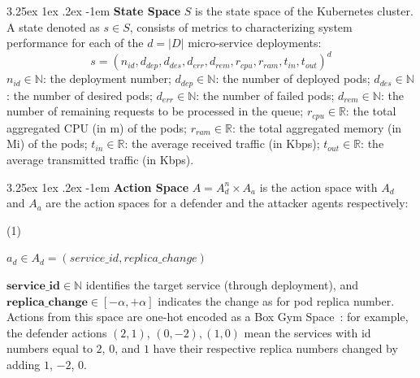 \documentclass[conference]{IEEEtran}
\makeatletter
\renewcommand\paragraph{\@startsection{paragraph}{5}{\z@}%
  {3.25ex \@plus1ex \@minus.2ex}%
  {-1em}%
  {\normalfont\normalsize\bfseries}}
\makeatother
\begin{document}
\noindent \paragraph{\textbf{State Space}} $S$ is the state space of the Kubernetes cluster. A state denoted as $s \in S$, consists of metrics to characterizing system performance for each of the $d = |D|$ micro-service deployments:
$$
s = (n_{id}, d_{dep}, d_{des}, d_{err}, d_{rem}, r_{cpu}, r_{ram}, t_{in}, t_{out})^d
$$
$n_{id} \in \mathbb{N}$: the deployment number; \quad
$d_{dep} \in \mathbb{N}$: the number of deployed pods; \quad 
$d_{des} \in \mathbb{N}$: the number of desired pods; \quad
$d_{err} \in \mathbb{N}$: the number of failed pods; \quad
$d_{rem} \in \mathbb{N}$: the number of remaining requests to be processed in the queue; \quad
$r_{cpu} \in \mathbb{R}$: the total aggregated CPU (in m) of the pods; \quad
$r_{ram} \in \mathbb{R}$: the total aggregated memory (in Mi) of the pods; \quad
$t_{in} \in \mathbb{R}$: the average received traffic (in Kbps); \quad
$t_{out} \in \mathbb{R}$: the average transmitted traffic (in Kbps).


\noindent \paragraph{\textbf{Action Space}} $A = A_d^n \times A_a$ is the action space with $A_d$ and $A_a$ are the action spaces for a defender and the attacker agents respectively:

\vspace{0.3cm}

\indent\begin{minipage}{0.15\linewidth}
    (1)
\end{minipage}
\begin{minipage}{0.9\linewidth}
    \raggedright
    $\displaystyle a_d \in A_d = (service\_id, replica\_change)$
\end{minipage}

\vspace{0.3cm}

\indent $\mathbf{service\_id} \in \mathbb{N}$ identifies the target service (through deployment), and $\mathbf{replica\_change} \in [-\alpha, +\alpha]$ indicates the change as for pod replica number. Actions from this space are one-hot encoded as a Box Gym Space~\cite{openAIGymActionSpaces}: for example, the defender actions $(2,1)$, $(0,-2), (1,0)$ mean the services with id numbers equal to $2$, $0$, and $1$ have their respective replica numbers changed by adding $1$, $-2$, $0$.
\end{document}

